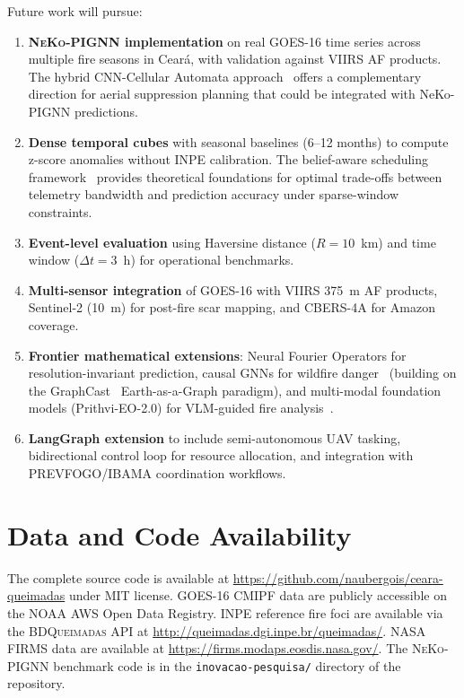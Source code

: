 \documentclass[11pt,twocolumn,a4paper]{article}
\newcommand{\abbrev}[1]{{\small\textsc{#1}}}
\begin{document}
Future work will pursue:
\begin{enumerate}
  \item \textbf{\abbrev{NeKo-PIGNN} implementation} on real \abbrev{GOES-16} time series across multiple fire seasons in Cear\'{a}, with validation against \abbrev{VIIRS} \abbrev{AF} products. The hybrid CNN-Cellular Automata approach~\cite{matei2026} offers a complementary direction for aerial suppression planning that could be integrated with NeKo-PIGNN predictions.
  \item \textbf{Dense temporal cubes} with seasonal baselines (6--12 months) to compute z-score anomalies without \abbrev{INPE} calibration. The belief-aware scheduling framework~\cite{shao2026} provides theoretical foundations for optimal trade-offs between telemetry bandwidth and prediction accuracy under sparse-window constraints.
  \item \textbf{Event-level evaluation} using Haversine distance ($R = 10$~km) and time window ($\Delta t = 3$~h) for operational benchmarks.
  \item \textbf{Multi-sensor integration} of \abbrev{GOES-16} with \abbrev{VIIRS} 375~m \abbrev{AF} products, Sentinel-2 (10~m) for post-fire scar mapping, and \abbrev{CBERS}-4A for Amazon coverage.
  \item \textbf{Frontier mathematical extensions}: Neural Fourier Operators for resolution-invariant prediction, causal \abbrev{GNN}s for wildfire danger~\cite{davalas2024} (building on the GraphCast~\cite{lam2023_graphcast} Earth-as-a-Graph paradigm), and multi-modal foundation models (Prithvi-EO-2.0) for \abbrev{VLM}-guided fire analysis~\cite{wildfirevlm2026}.
  \item \textbf{LangGraph extension} to include semi-autonomous UAV tasking, bidirectional control loop for resource allocation, and integration with \abbrev{PREVFOGO}/IBAMA coordination workflows.
\end{enumerate}

\section*{Data and Code Availability}

The complete source code is available at \url{https://github.com/naubergois/ceara-queimadas} under MIT license. \abbrev{GOES-16} \abbrev{CMIPF} data are publicly accessible on the \abbrev{NOAA} AWS Open Data Registry. \abbrev{INPE} reference fire foci are available via the \abbrev{BDQueimadas} \abbrev{API} at \url{http://queimadas.dgi.inpe.br/queimadas/}. \abbrev{NASA} \abbrev{FIRMS} data are available at \url{https://firms.modaps.eosdis.nasa.gov/}. The \abbrev{NeKo-PIGNN} benchmark code is in the \texttt{inovacao-pesquisa/} directory of the repository.
\end{document}
